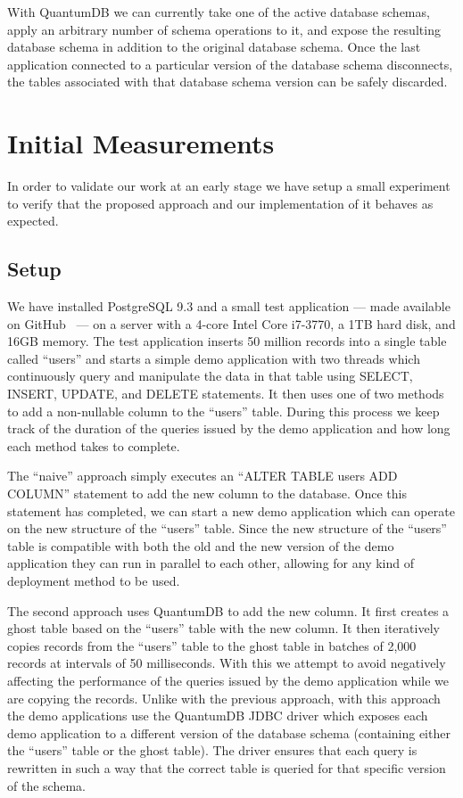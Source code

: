 \documentclass[conference]{IEEEtran}
\begin{document}
With QuantumDB we can currently take one of the active database schemas, apply an arbitrary number of schema operations to it, and expose the resulting database schema in addition to the original database schema. Once the last application connected to a particular version of the database schema disconnects, the tables associated with that database schema version can be safely discarded.

\section{Initial Measurements} %

In order to validate our work at an early stage we have setup a small experiment to verify that the proposed approach and our implementation of it behaves as expected. 

\subsection{Setup}
We have installed PostgreSQL 9.3 and a small test application --- made available on GitHub~\cite{QuantumDB-RelEng-Demo} --- on a server with a 4-core Intel Core i7-3770, a 1TB hard disk, and 16GB memory. The test application inserts 50 million records into a single table called ``users'' and starts a simple demo application with two threads which continuously query and manipulate the data in that table using SELECT, INSERT, UPDATE, and DELETE statements. It then uses one of two methods to add a non-nullable column to the ``users'' table. During this process we keep track of the duration of the queries issued by the demo application and how long each method takes to complete. 

The ``naive'' approach simply executes an ``ALTER TABLE users ADD COLUMN'' statement to add the new column to the database. Once this statement has completed, we can start a new demo application which can operate on the new structure of the ``users'' table. Since the new structure of the ``users'' table is compatible with both the old and the new version of the demo application they can run in parallel to each other, allowing for any kind of deployment method to be used. 

The second approach uses QuantumDB to add the new column. It first creates a ghost table based on the ``users'' table with the new column. It then iteratively copies records from the ``users'' table to the ghost table in batches of 2,000 records at intervals of 50 milliseconds. With this we attempt to avoid negatively affecting the performance of the queries issued by the demo application while we are copying the records. Unlike with the previous approach, with this approach the demo applications use the QuantumDB JDBC driver which exposes each demo application to a different version of the database schema (containing either the ``users'' table or the ghost table). The driver ensures that each query is rewritten in such a way that the correct table is queried for that specific version of the schema.
\end{document}
